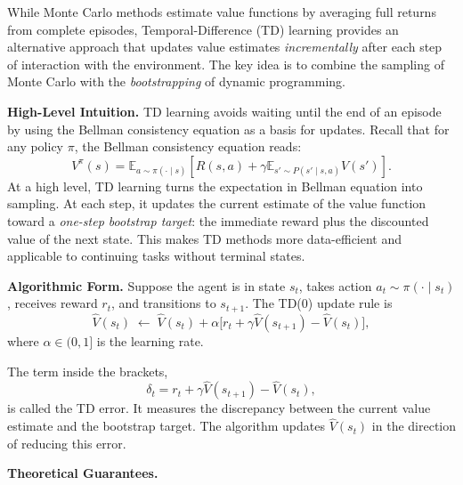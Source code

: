 \documentclass[
]{book}
\theoremstyle{definition}
\theoremstyle{definition}
\theoremstyle{definition}
\theoremstyle{definition}
\theoremstyle{remark}
\begin{document}
While Monte Carlo methods estimate value functions by averaging full returns from complete episodes, Temporal-Difference (TD) learning provides an alternative approach that updates value estimates \emph{incrementally} after each step of interaction with the environment. The key idea is to combine the sampling of Monte Carlo with the \emph{bootstrapping} of dynamic programming.

\textbf{High-Level Intuition.} TD learning avoids waiting until the end of an episode by using the Bellman consistency equation as a basis for updates. Recall that for any policy \(\pi\), the Bellman consistency equation reads:
\begin{equation}
V^\pi(s) = \mathbb{E}_{a \sim \pi(\cdot \mid s)} \left[ R(s,a) + \gamma \mathbb{E}_{s' \sim P(s' \mid s, a)} V(s')  \right].
\label{eq:InfiniteHorizonBellmanConsistencyRestate}
\end{equation}
At a high level, TD learning turns the expectation in Bellman equation into sampling.
At each step, it updates the current estimate of the value function toward a \emph{one-step bootstrap target}: the immediate reward plus the discounted value of the next state. This makes TD methods more data-efficient and applicable to continuing tasks without terminal states.

\textbf{Algorithmic Form.} Suppose the agent is in state \(s_t\), takes action \(a_t \sim \pi(\cdot \mid s_t)\), receives reward \(r_t\), and transitions to \(s_{t+1}\). The TD(0) update rule is
\begin{equation}
\hat{V}(s_t) \;\leftarrow\; \hat{V}(s_t) + \alpha \big[ r_t + \gamma \hat{V}(s_{t+1}) - \hat{V}(s_t) \big],
\label{eq:TDZeroUpdate}
\end{equation}
where \(\alpha \in (0,1]\) is the learning rate.

The term inside the brackets,
\begin{equation}
\delta_t = r_t + \gamma \hat{V}(s_{t+1}) - \hat{V}(s_t),
\label{eq:TDError}
\end{equation}
is called the TD error. It measures the discrepancy between the current value estimate and the bootstrap target. The algorithm updates \(\hat{V}(s_t)\) in the direction of reducing this error.

\textbf{Theoretical Guarantees.}
\end{document}
